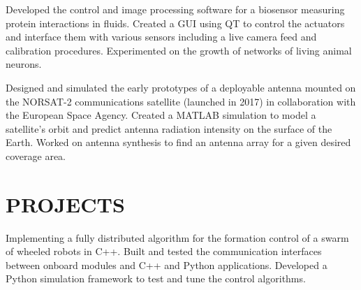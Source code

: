 \documentclass{ResumeTemplate}
\begin{document}
\begin{minipage}[c]{0.66\linewidth}
        
        \workitemsthree
        {Developed the control and image processing software for a biosensor measuring protein interactions in fluids.}
        {Created a GUI using QT to control the actuators and interface them with various sensors including a live camera feed and calibration procedures.}
        {Experimented on the growth of networks of living animal neurons.}


        \workitemstwo
        {Designed and simulated the early prototypes of a deployable antenna mounted on the NORSAT-2 communications satellite (launched in 2017) in collaboration with the European Space Agency.}
        {Created a MATLAB simulation to model a satellite's orbit and predict antenna radiation intensity on the surface of the Earth. Worked on antenna synthesis to find an antenna array for a given desired coverage area.}
        \vspace*{\baselineskip}
        
        \section{PROJECTS} %
        

        \workitemsthree
        {Implementing a fully distributed algorithm for the formation control of a swarm of wheeled robots in C++.}
        {Built and tested the communication interfaces between onboard modules and C++ and Python applications.}
        {Developed a Python simulation framework to test and tune the control algorithms. }
        


\end{minipage}
\end{document}
